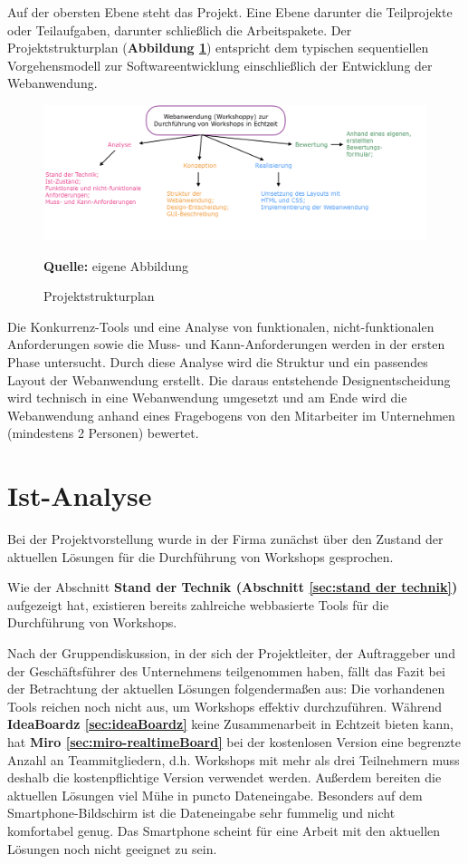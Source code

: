 Auf der obersten Ebene steht das Projekt. Eine Ebene darunter die Teilprojekte oder Teilaufgaben, darunter schließlich die Arbeitspakete. Der Projektstrukturplan (\textbf{Abbildung \ref{fig:projektstruktur}}) entspricht dem typischen sequentiellen Vorgehensmodell zur Softwareentwicklung einschließlich der Entwicklung der Webanwendung. 

\begin{figure}[H]
  \begin{center}
    \includegraphics[scale=0.4]{img/projektstruktur}
	\caption{Projektstrukturplan} 
	\footnotesize\sffamily\textbf{Quelle:} eigene Abbildung  
	\label{fig:projektstruktur}
  \end{center}   
\end{figure}

Die Konkurrenz-Tools und eine Analyse von funktionalen, nicht-funktionalen Anforderungen sowie die Muss- und Kann-Anforderungen werden in der ersten Phase untersucht. Durch diese Analyse wird die Struktur und ein passendes Layout der Webanwendung erstellt. Die daraus entstehende Designentscheidung wird technisch in eine Webanwendung umgesetzt und am Ende wird die Webanwendung anhand eines Fragebogens von den Mitarbeiter im Unternehmen (mindestens 2 Personen) bewertet.

\newpage
\section{Ist-Analyse}
\label{sec:istAnalyse}
Bei der Projektvorstellung wurde in der Firma zunächst über den Zustand der aktuellen Lösungen für die Durchführung von Workshops gesprochen.\bigskip

Wie der Abschnitt \textbf{Stand der Technik (Abschnitt \ref{sec:stand der technik})} aufgezeigt hat, existieren bereits zahlreiche webbasierte Tools für die Durchführung von Workshops.\bigskip

Nach der Gruppendiskussion, in der sich der Projektleiter, der Auftraggeber und der Geschäftsführer des Unternehmens teilgenommen haben, fällt das Fazit bei der Betrachtung der aktuellen Lösungen folgendermaßen aus: Die vorhandenen Tools reichen noch nicht aus, um Workshops effektiv durchzuführen. Während \textbf{IdeaBoardz \ref{sec:ideaBoardz}} keine Zusammenarbeit in Echtzeit bieten kann, hat \textbf{Miro \ref{sec:miro-realtimeBoard}} bei der kostenlosen Version eine begrenzte Anzahl an Teammitgliedern, d.h. Workshops mit mehr als drei Teilnehmern muss deshalb die kostenpflichtige Version verwendet werden. Außerdem bereiten die aktuellen Lösungen viel Mühe in puncto Dateneingabe. Besonders auf dem Smartphone-Bildschirm ist die Dateneingabe sehr fummelig und nicht komfortabel genug. Das Smartphone scheint für eine Arbeit mit den aktuellen Lösungen noch nicht geeignet zu sein. \bigskip

